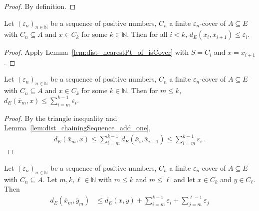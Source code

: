 \begin{proof}\leanok
By definition.
\end{proof}


\begin{lemma}\label{lem:dist_chainingSequence_add_one}
  \leanok
Let $(\varepsilon_n)_{n \in \mathbb{N}}$ be a sequence of positive numbers, $C_n$ a finite $\varepsilon_n$-cover of $A \subseteq E$ with $C_n \subseteq A$ and $x \in C_k$ for some $k \in \mathbb{N}$.
Then for all $i < k$, $d_E(\bar{x}_i, \bar{x}_{i+1}) \le \varepsilon_i$.
\end{lemma}

\begin{proof}\leanok
Apply Lemma~\ref{lem:dist_nearestPt_of_isCover} with $S = C_i$ and $x = \bar{x}_{i+1}$.
\end{proof}


\begin{lemma}\label{lem:dist_chainingSequence_le_sum}
  \leanok
Let $(\varepsilon_n)_{n \in \mathbb{N}}$ be a sequence of positive numbers, $C_n$ a finite $\varepsilon_n$-cover of $A \subseteq E$ with $C_n \subseteq A$ and $x \in C_k$ for some $k \in \mathbb{N}$.
Then for $m \le k$, $d_E(\bar{x}_m, x) \le \sum_{i=m}^{k-1} \varepsilon_i$.
\end{lemma}

\begin{proof}\leanok
By the triangle inequality and Lemma~\ref{lem:dist_chainingSequence_add_one},
\begin{align*}
  d_E(\bar{x}_m, x)
  \le \sum_{i=m}^{k-1} d_E(\bar{x}_i, \bar{x}_{i+1})
  \le \sum_{i=m}^{k-1} \varepsilon_i
  \: .
\end{align*}
\end{proof}


\begin{lemma}\label{lem:dist_chainingSequence_le}
  \leanok
Let $(\varepsilon_n)_{n \in \mathbb{N}}$ be a sequence of positive numbers, $C_n$ a finite $\varepsilon_n$-cover of $A \subseteq E$ with $C_n \subseteq A$.
Let $m, k, \ell \in \mathbb{N}$ with $m \le k$ and $m \le \ell$ and let $x \in C_k$ and $y \in C_\ell$.
Then
\begin{align*}
  d_E(\bar{x}_m, \bar{y}_m)
  &\le d_E(x, y) + \sum_{i=m}^{k-1} \varepsilon_i + \sum_{j=m}^{\ell-1} \varepsilon_j
\end{align*}
\end{lemma}

